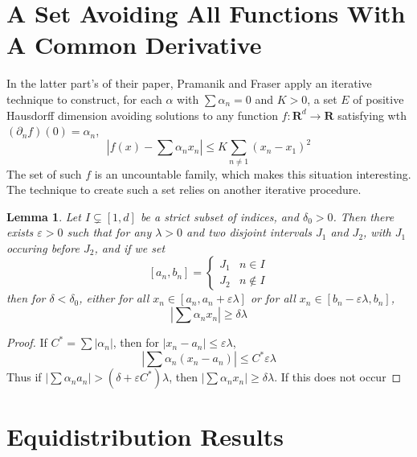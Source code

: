 \documentclass{report}
\theoremstyle{plain}
\newtheorem{lemma}{Lemma}
\theoremstyle{plain}
\begin{document}
\section{A Set Avoiding All Functions With A Common Derivative}

In the latter part's of their paper, Pramanik and Fraser apply an iterative technique to construct, for each $\alpha$ with $\sum \alpha_n = 0$ and $K > 0$, a set $E$ of positive Hausdorff dimension avoiding solutions to any function $f: \mathbf{R}^d \to \mathbf{R}$ satisfying wth $(\partial_n f)(0) = \alpha_n$,
%
\[ \left| f(x) - \sum \alpha_n x_n \right| \leq K \sum_{n \neq 1} (x_n - x_1)^2 \]
%
The set of such $f$ is an uncountable family, which makes this situation interesting. The technique to create such a set relies on another iterative procedure.

\begin{lemma}
    Let $I \subsetneq [1,d]$ be a strict subset of indices, and $\delta_0 > 0$. Then there exists $\varepsilon > 0$ such that for any $\lambda > 0$ and two disjoint intervals $J_1$ and $J_2$, with $J_1$ occuring before $J_2$, and if we set
    \[ [a_n,b_n] = \begin{cases} J_1 & n \in I \\ J_2 & n \not \in I \end{cases} \]
    then for $\delta < \delta_0$, either for all $x_n \in [a_n,a_n+\varepsilon \lambda]$ or for all $x_n \in [b_n - \varepsilon \lambda, b_n]$,
    \[ \left| \sum \alpha_n x_n \right| \geq \delta \lambda \]
\end{lemma}
\begin{proof}
    If $C^* = \sum |\alpha_n|$, then for $|x_n - a_n| \leq \varepsilon \lambda$,
    \[ |\sum \alpha_n (x_n - a_n)| \leq C^* \varepsilon \lambda \]
    Thus if $|\sum \alpha_n a_n| > (\delta + \varepsilon C^*)\lambda$, then $|\sum \alpha_n x_n| \geq \delta \lambda$. If this does not occur
\end{proof}









\section{Equidistribution Results}
\end{document}
